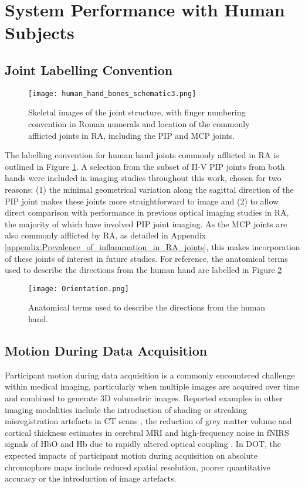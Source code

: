 \documentclass[twoside]{bhamthesis}
\theoremstyle{definition}
\begin{document}
\section{System Performance with Human Subjects}

\subsection{Joint Labelling Convention}

\begin{figure}[!ht]
\centering\texttt{[image: human\_hand\_bones\_schematic3.png]}
\caption{Skeletal images of the joint structure, with finger numbering convention in Roman numerals and location of the commonly afflicted joints in RA, including the PIP and MCP joints.}
\label{Joint_labelling_convention}
\end{figure}

The labelling convention for human hand joints commonly afflicted in RA is outlined in Figure \ref{Joint_labelling_convention}. A selection from the subset of II-V PIP joints from both hands were included in imaging studies throughout this work, chosen for two reasons: (1) the minimal geometrical variation along the sagittal direction of the PIP joint makes these joints more straightforward to image and (2) to allow direct comparison with performance in previous optical imaging studies in RA, the majority of which have involved PIP joint imaging. As the MCP joints are also commonly afflicted by RA, as detailed in Appendix \ref{appendix:Prevalence_of_inflammation_in_RA_joints}, this makes incorporation of these joints of interest in future studies. For reference, the anatomical terms used to describe the directions from the human hand are labelled in Figure \ref{Orientation}

\begin{figure}[!ht]
\centering\texttt{[image: Orientation.png]}
\caption{Anatomical terms used to describe the directions from the human hand.}
\label{Orientation}
\end{figure}

\subsection{Motion During Data Acquisition}
\label{Section:motion}

Participant motion during data acquisition is a commonly encountered challenge within medical imaging, particularly when multiple images are acquired over time and combined to generate 3D volumetric images. Reported examples in other imaging modalities include the introduction of shading or streaking misregistration artefacts in CT scans \cite{barrett2004artifacts}, the reduction of grey matter volume and cortical thickness estimates in cerebral MRI \cite{reuter2015head} and high-frequency noise in fNIRS signals of  HbO and Hb due to rapidly altered optical coupling \cite{cooper2012systematic}. In DOT, the expected impacts of participant motion during acquisition on absolute chromophore maps include reduced spatial resolution, poorer quantitative accuracy or the introduction of image artefacts. 
\end{document}
